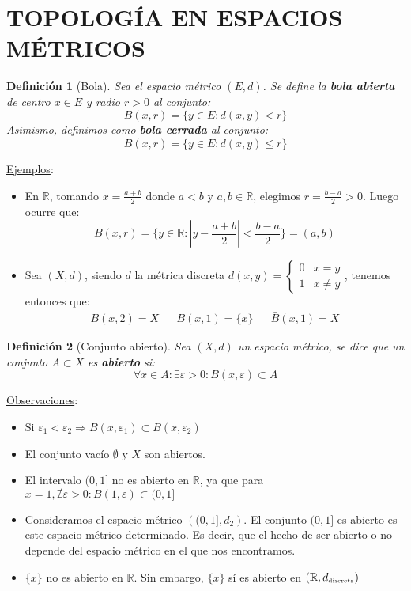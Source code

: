 \documentclass[10pt,a4paper,openright]{book}
\theoremstyle{break}
\newtheorem*{defi}{Definición}
\begin{document}
\section*{TOPOLOGÍA EN ESPACIOS MÉTRICOS}
\begin{defi}[Bola]
Sea el espacio métrico $(E,d)$. Se define la \textbf{bola abierta} de centro $x\in E$ y radio $r>0$ al conjunto:
$$B(x,r) = \{y \in E : d(x,y) < r\}$$
Asimismo, definimos como \textbf{bola cerrada} al conjunto:
$$\bar{B}(x,r) = \{y \in E : d(x,y) \leq r\}$$
\end{defi}

\underline{Ejemplos}:
\begin{itemize}
\item En $\mathbb{R}$, tomando $x = \frac{a+b}{2}$ donde $a < b$ y $a,b \in \mathbb{R}$, elegimos $r = \frac{b-a}{2} > 0$. Luego ocurre que:
$$B(x,r) = \{y \in \mathbb{R} : \left| y - \frac{a+b}{2}\right| < \frac{b-a}{2}\} = (a,b)$$

\item Sea $(X,d)$, siendo $d$ la métrica discreta $d(x,y) = \begin{cases} 0 & x=y \\ 1 & x \neq y \end{cases}$, tenemos entonces que:
\begin{align*}
B(x,2) = X && B(x,1) = \{x\} && \bar{B}(x,1) = X
\end{align*}
\end{itemize}

\begin{defi}[Conjunto abierto]
Sea $(X,d)$ un espacio métrico, se dice que un conjunto $A \subset X$ es \textbf{abierto} si:
$$\forall x \in A : \exists \varepsilon > 0 : B(x,\varepsilon) \subset A$$
\end{defi}

\underline{Observaciones}:
\begin{itemize}
\item Si $\varepsilon_1 < \varepsilon_2 \Rightarrow B(x,\varepsilon_1) \subset B(x,\varepsilon_2)$

\item El conjunto vacío $\emptyset$ y $X$ son abiertos.

\item El intervalo $(0,1]$ no es abierto en $\mathbb{R}$, ya que para $x=1, \nexists \varepsilon > 0 : B(1,\varepsilon) \subset (0,1]$

\item Consideramos el espacio métrico $\left( (0,1], d_2 \right)$. El conjunto $(0,1]$ es abierto es este espacio métrico determinado. Es decir, que el hecho de ser abierto o no depende del espacio métrico en el que nos encontramos.

\item $\{x\}$ no es abierto en $\mathbb{R}$. Sin embargo, $\{x\}$ sí es abierto en $(\mathbb{R}, d_{\mbox{\tiny discreta}})$

\end{itemize}
\end{document}
